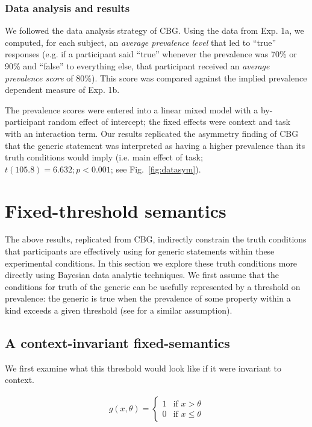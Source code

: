 \documentclass[10pt,letterpaper]{article}
\begin{document}
\subsubsection{Data analysis and results}

%
We followed the data analysis strategy of CBG. Using the data from Exp. 1a, we computed, for each subject, an \emph{average prevalence level} that led to ``true'' responses (e.g. if a participant said ``true'' whenever the prevalence was 70\% or 90\% and ``false'' to everything else, that participant received an \emph{average prevalence score} of 80\%). This score was compared against the implied prevalence dependent measure of Exp. 1b. 

The prevalence scores were entered into a linear mixed model with a by-participant random effect of intercept; the fixed effects were context and task with an interaction term. Our results replicated the asymmetry finding of CBG that the generic statement was interpreted as having a higher prevalence than its truth conditions would imply (i.e. main effect of task; $t(105.8) = 6.632; p < 0.001$; see Fig.~\ref{fig:datasym}).

\section{Fixed-threshold semantics}
The above results, replicated from CBG, indirectly constrain the truth conditions that participants are effectively using for generic statements within these experimental conditions. In this section we explore these truth conditions more directly using Bayesian data analytic techniques.
%
We first assume that the conditions for truth of the generic can be usefully represented by a threshold on prevalence: the generic is true when the prevalence of some property within a kind exceeds a given threshold (see  for a similar assumption).


\subsection{A context-invariant fixed-semantics}
We first examine what this threshold would look like if it were invariant to context. 

\begin{align}
 g(x, \theta) = \begin{cases}
   1 & \text{if } x > \theta \\
   0       & \text{if } x \leq \theta
  \end{cases}
   \label{eq:ftsem}
\end{align}
\end{document}
